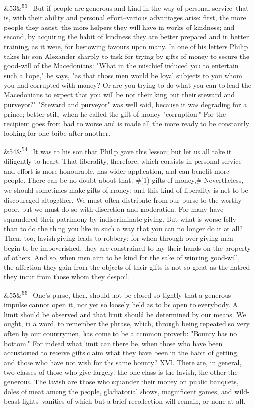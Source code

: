 \documentclass[12pt]{article}
\newcommand{\para}[1][]{\par\noindent\ifx&#1&\else\textsuperscript{\footnotesize #1}~\fi}
\begin{document}
\para[53] But if people are generous and kind in the way of personal service--that is, with their ability and personal effort--various advantages arise: first, the more people they assist, the more helpers they will have in works of kindness; and second, by acquiring the habit of kindness they are better prepared and in better training, as it were, for bestowing favours upon many. In one of his letters Philip takes his son Alexander sharply to task for trying by gifts of money to secure the good-will of the Macedonians: "What in the mischief induced you to entertain such a hope," he says, "as that those men would be loyal subjects to you whom you had corrupted with money? Or are you trying to do what you can to lead the Macedonians to expect that you will be not their king but their steward and purveyor?" "Steward and purveyor" was well said, because it was degrading for a prince; better still, when he called the gift of money "corruption." For the recipient goes from bad to worse and is made all the more ready to be constantly looking for one bribe after another.

\para[54] It was to his son that Philip gave this lesson; but let us all take it diligently to heart. That liberality, therefore, which consists in personal service and effort is more honourable, has wider application, and can benefit more people. There can be no doubt about that. \#(1) gifts of money,\# Nevertheless, we should sometimes make gifts of money; and this kind of liberality is not to be discouraged altogether. We must often distribute from our purse to the worthy poor, but we must do so with discretion and moderation. For many have squandered their patrimony by indiscriminate giving. But what is worse folly than to do the thing you like in such a way that you can no longer do it at all? Then, too, lavish giving leads to robbery; for when through over-giving men begin to be impoverished, they are constrained to lay their hands on the property of others. And so, when men aim to be kind for the sake of winning good-will, the affection they gain from the objects of their gifts is not so great as the hatred they incur from those whom they despoil.

\para[55] One's purse, then, should not be closed so tightly that a generous impulse cannot open it, nor yet so loosely held as to be open to everybody. A limit should be observed and that limit should be determined by our means. We ought, in a word, to remember the phrase, which, through being repeated so very often by our countrymen, has come to be a common proverb: "Bounty has no bottom." For indeed what limit can there be, when those who have been accustomed to receive gifts claim what they have been in the habit of getting, and those who have not wish for the same bounty? XVI. There are, in general, two classes of those who give largely: the one class is the lavish, the other the generous. The lavish are those who squander their money on public banquets, doles of meat among the people, gladiatorial shows, magnificent games, and wild-beast fights--vanities of which but a brief recollection will remain, or none at all.
\end{document}
